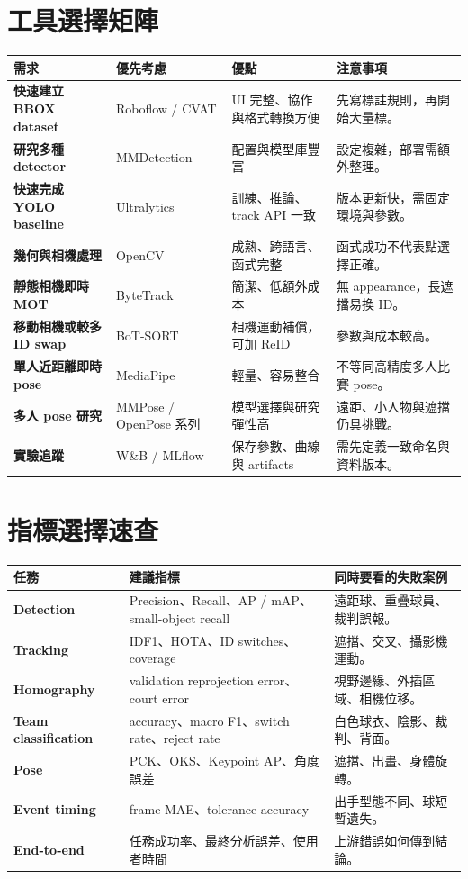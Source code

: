 \documentclass[11pt,a4paper,oneside]{report}
\begin{document}
\chapter{工具選擇矩陣}

\begin{tabularx}{\textwidth}{>{\bfseries}p{3cm} Y Y Y}
\toprule
需求 & 優先考慮 & 優點 & 注意事項 \\
\midrule
快速建立 BBOX dataset & Roboflow / CVAT & UI 完整、協作與格式轉換方便 & 先寫標註規則，再開始大量標。\\
研究多種 detector & MMDetection & 配置與模型庫豐富 & 設定複雜，部署需額外整理。\\
快速完成 YOLO baseline & Ultralytics & 訓練、推論、track API 一致 & 版本更新快，需固定環境與參數。\\
幾何與相機處理 & OpenCV & 成熟、跨語言、函式完整 & 函式成功不代表點選擇正確。\\
靜態相機即時 MOT & ByteTrack & 簡潔、低額外成本 & 無 appearance，長遮擋易換 ID。\\
移動相機或較多 ID swap & BoT-SORT & 相機運動補償，可加 ReID & 參數與成本較高。\\
單人近距離即時 pose & MediaPipe & 輕量、容易整合 & 不等同高精度多人比賽 pose。\\
多人 pose 研究 & MMPose / OpenPose 系列 & 模型選擇與研究彈性高 & 遠距、小人物與遮擋仍具挑戰。\\
實驗追蹤 & W\&B / MLflow & 保存參數、曲線與 artifacts & 需先定義一致命名與資料版本。\\
\bottomrule
\end{tabularx}

\chapter{指標選擇速查}

\begin{tabularx}{\textwidth}{>{\bfseries}p{3.3cm} Y Y}
\toprule
任務 & 建議指標 & 同時要看的失敗案例 \\
\midrule
Detection & Precision、Recall、AP / mAP、small-object recall & 遠距球、重疊球員、裁判誤報。\\
Tracking & IDF1、HOTA、ID switches、coverage & 遮擋、交叉、攝影機運動。\\
Homography & validation reprojection error、court error & 視野邊緣、外插區域、相機位移。\\
Team classification & accuracy、macro F1、switch rate、reject rate & 白色球衣、陰影、裁判、背面。\\
Pose & PCK、OKS、Keypoint AP、角度誤差 & 遮擋、出畫、身體旋轉。\\
Event timing & frame MAE、tolerance accuracy & 出手型態不同、球短暫遺失。\\
End-to-end & 任務成功率、最終分析誤差、使用者時間 & 上游錯誤如何傳到結論。\\
\bottomrule
\end{tabularx}
\end{document}
